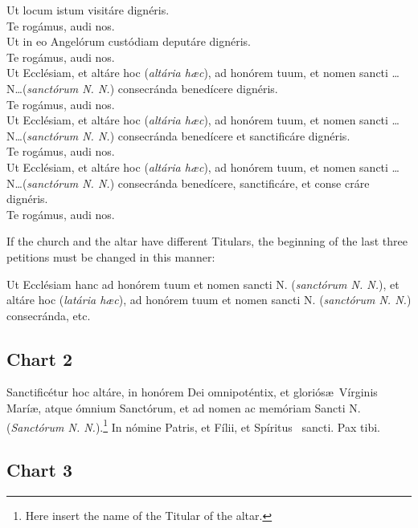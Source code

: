 \documentclass[letterpaper]{report}
\begin{document}
{    \vbar Ut locum istum visit\'are dign\'eris.\\
    \rbar Te rog\'amus, audi nos.\\
    \vbar Ut in eo Angel\'orum cust\'odiam deput\'are dign\'eris.\\
    \rbar Te rog\'amus, audi nos.\\
    \vbar Ut Eccl\'esiam, et alt\'are hoc (\textit{alt\'aria h\ae c}), ad
    hon\'orem tuum, et nomen sancti \dots N\dots (\textit{sanct\'orum N. N.})
    consecr\'anda bene\cross d\'icere dign\'eris.\\
    \rbar Te rog\'amus, audi nos.\\
    \vbar Ut Eccl\'esiam, et alt\'are hoc (\textit{alt\'aria h\ae c}), ad
    hon\'orem tuum, et nomen sancti \dots N\dots (\textit{sanct\'orum N. N.})
    consecr\'anda bene\cross d\'icere et sancti\cross fic\'are dign\'eris.\\
    \rbar Te rog\'amus, audi nos.\\
    \vbar Ut Eccl\'esiam, et alt\'are hoc (\textit{alt\'aria h\ae c}), ad
    hon\'orem tuum, et nomen sancti \dots N\dots (\textit{sanct\'orum N. N.})
    consecr\'anda bene\cross d\'icere, sancti\cross fic\'are, et conse\cross
    cr\'are dign\'eris.\\
    \rbar Te rog\'amus, audi nos.

    If the church and the altar have different Titulars, the beginning of the
    last three petitions must be changed in this manner:

    Ut Eccl\'esiam hanc ad hon\'orem tuum et nomen sancti N.
    (\textit{sanct\'orum N. N.}), et alt\'are hoc (\textit{lat\'aria h\ae c}),
    ad hon\'orem tuum et nomen sancti N. (\textit{sanct\'orum N. N.})
    consecr\'anda, etc.

    \subsection*{Chart 2}

    Sancti\cross fic\'etur hoc alt\'are, in hon\'orem Dei omnipot\'entix, et
    glori\'os\ae\ V\'irginis Mar\'i\ae, atque \'omnium Sanct\'orum, et ad nomen
    ac mem\'oriam Sancti N. (\textit{Sanct\'orum N. N.}).\footnote{Here insert
    the name of the Titular of the altar.} In n\'omine Pa\cross tris, et
    F\'i\cross lii, et Sp\'iritus \cross\ sancti. Pax tibi.

    \subsection*{Chart 3}

}
\end{document}

